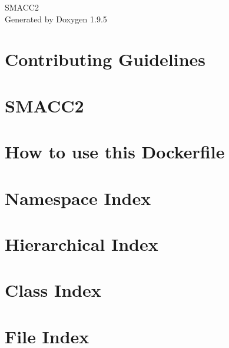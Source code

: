\documentclass[twoside]{book}
\newcommand{\+}{\discretionary{\mbox{\scriptsize$\hookleftarrow$}}{}{}}
\newcommand{\clearemptydoublepage}{%
    \newpage{\pagestyle{empty}\cleardoublepage}%
  }
\begin{document}
  \raggedbottom
    \hypersetup{pageanchor=false,
                bookmarksnumbered=true,
                pdfencoding=unicode
               }
  \begin{titlepage}
  \vspace*{7cm}
  \begin{center}%
  {\Large SMACC2}\\
  \vspace*{1cm}
  {\large Generated by Doxygen 1.9.5}\\
  \end{center}
  \end{titlepage}
  \clearemptydoublepage
  \tableofcontents
  \clearemptydoublepage
  \hypersetup{pageanchor=true}
\chapter{Contributing Guidelines}
\label{md_CONTRIBUTING}

\chapter{SMACC2}
\label{md_README}

\chapter{How to use this Dockerfile}
\label{md_smacc2_ci_docker_ros_rollingAndGalactic_ubuntu_20_04_README}

\chapter{Namespace Index}

\chapter{Hierarchical Index}

\chapter{Class Index}

\chapter{File Index}

\end{document}
